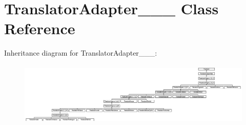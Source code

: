 \hypertarget{class_translator_adapter__1__8__4}{}\section{Translator\+Adapter\+\_\+\_\+\_ Class Reference}
\label{class_translator_adapter__1__8__4}
Inheritance diagram for Translator\+Adapter\+\_\+\_\+\_\+:\begin{figure}[H]
\begin{center}
\leavevmode
\includegraphics[height=3.022942cm]{class_translator_adapter__1__8__4}
\end{center}
\end{figure}
